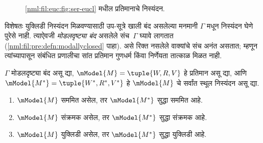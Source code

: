 \begin{figure}[ht]
  \centering
  \caption{\ref{nml:fil:euc:fig:ser-eucl} मधील प्रतिमानाचे निस्यंदन.}
  \label{nml:fil:euc:fig:ser-eucl2}
\end{figure}

विशेषतः युक्लिडी निस्यंदन मिळवण्यासाठी
उप-सूत्रे खाली बंद असलेल्या मनमानी $\Gamma$
मधून निस्यंदन घेणे पुरेसे नाही. त्याऐवजी
\emph{मोडलदृष्ट्या बंद} असलेले संच~$\Gamma$
घ्यावे लागतात (\ref{nml:fil:pre:defn:modallyclosed} पाहा).
असे रिक्त नसलेले वाक्यांचे संच अनंत असतात; म्हणून त्यांच्यापासून
संबंधित प्रणालीचा सांत प्रतिमान गुणधर्म किंवा
निर्णेयता तात्काळ मिळत नाही.

\begin{thm}\label{nml:fil:euc:thm:modal-closed-filt}
  $\Gamma$ मोडलदृष्ट्या बंद असू द्या,
  $\mModel{M}=\tuple{W,R,V}$ हे प्रतिमान असू द्या,
  आणि $\mModel{M^*} = \tuple{W^*,R^*,V^*}$ हे
  $\mModel{M}$ चे सर्वांत स्थूल निस्यंदन असू द्या.
  \begin{enumerate}
  \item $\mModel{M}$ सममित असेल, तर $\mModel{M^*}$ सुद्धा सममित आहे.
  \item $\mModel{M}$ संक्रमक असेल, तर $\mModel{M^*}$ सुद्धा संक्रमक आहे.
  \item $\mModel{M}$ युक्लिडी असेल, तर $\mModel{M^*}$ सुद्धा युक्लिडी आहे.
  \end{enumerate}
\end{thm}

